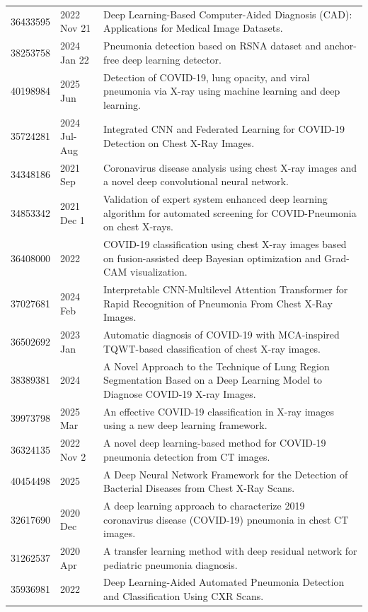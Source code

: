 \begin{longtable}{llp{9.5cm}}
36433595 & 2022 Nov 21 & Deep Learning-Based Computer-Aided Diagnosis (CAD): Applications for Medical Image Datasets. \\
38253758 & 2024 Jan 22 & Pneumonia detection based on RSNA dataset and anchor-free deep learning detector. \\
40198984 & 2025 Jun & Detection of COVID-19, lung opacity, and viral pneumonia via X-ray using machine learning and deep learning. \\
35724281 & 2024 Jul-Aug & Integrated CNN and Federated Learning for COVID-19 Detection on Chest X-Ray Images. \\
34348186 & 2021 Sep & Coronavirus disease analysis using chest X-ray images and a novel deep convolutional neural network. \\
34853342 & 2021 Dec 1 & Validation of expert system enhanced deep learning algorithm for automated screening for COVID-Pneumonia on chest X-rays. \\
36408000 & 2022 & COVID-19 classification using chest X-ray images based on fusion-assisted deep Bayesian optimization and Grad-CAM visualization. \\
37027681 & 2024 Feb & Interpretable CNN-Multilevel Attention Transformer for Rapid Recognition of Pneumonia From Chest X-Ray Images. \\
36502692 & 2023 Jan & Automatic diagnosis of COVID-19 with MCA-inspired TQWT-based classification of chest X-ray images. \\
38389381 & 2024 & A Novel Approach to the Technique of Lung Region Segmentation Based on a Deep Learning Model to Diagnose COVID-19 X-ray Images. \\
39973798 & 2025 Mar & An effective COVID-19 classification in X-ray images using a new deep learning framework. \\
36324135 & 2022 Nov 2 & A novel deep learning-based method for COVID-19 pneumonia detection from CT images. \\
40454498 & 2025 & A Deep Neural Network Framework for the Detection of Bacterial Diseases from Chest X-Ray Scans. \\
32617690 & 2020 Dec & A deep learning approach to characterize 2019 coronavirus disease (COVID-19) pneumonia in chest CT images. \\
31262537 & 2020 Apr & A transfer learning method with deep residual network for pediatric pneumonia diagnosis. \\
35936981 & 2022 & Deep Learning-Aided Automated Pneumonia Detection and Classification Using CXR Scans. \\

\end{longtable}
